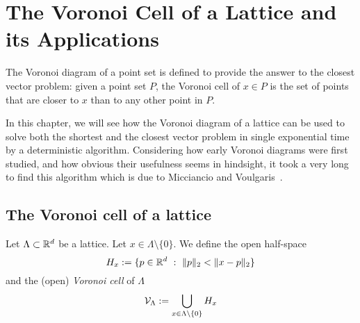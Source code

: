 %
%
%

\chapter{The Voronoi Cell of a Lattice and its Applications}

The Voronoi diagram of a point set is defined
to provide the answer to the closest vector problem:
given a point set $P$,
the Voronoi cell of $x \in P$ is the set of points
that are closer to $x$ than to any other point in $P$.

In this chapter, we will see how the Voronoi diagram of a lattice
can be used to solve both the shortest and the closest vector problem
in single exponential time by a deterministic algorithm.
Considering how early Voronoi diagrams were first studied,
and how obvious their usefulness seems in hindsight,
it took a very long to find this algorithm
which is due to Micciancio and Voulgaris~\cite{MR2743283}.


\section{The Voronoi cell of a lattice}

\begin{definition}
  Let $\Lambda \subset \mathbb{R}^d$ be a lattice.
  Let $x \in \Lambda \setminus \{ 0 \}$.
  We define the open half-space
  \[
    H_x := \{ p \in \mathbb{R}^d ~:~ \|p\|_2 < \|x-p\|_2 \}
  \]
  and the (open) \emph{Voronoi cell} of $\Lambda$
  \[
    \mathcal{V}_\Lambda := \bigcup_{x \in \Lambda\setminus\{0\}} H_x
  \]
\end{definition}

